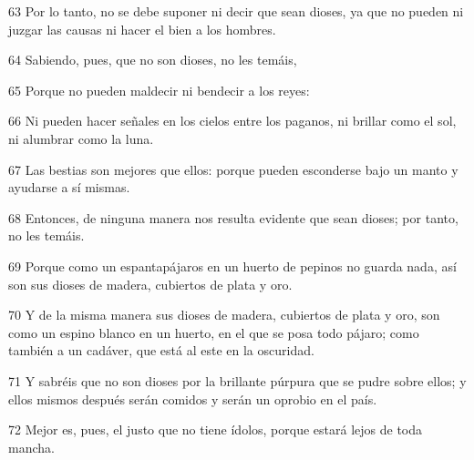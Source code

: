 \par 63 Por lo tanto, no se debe suponer ni decir que sean dioses, ya que no pueden ni juzgar las causas ni hacer el bien a los hombres.
\par 64 Sabiendo, pues, que no son dioses, no les temáis,
\par 65 Porque no pueden maldecir ni bendecir a los reyes:
\par 66 Ni pueden hacer señales en los cielos entre los paganos, ni brillar como el sol, ni alumbrar como la luna.
\par 67 Las bestias son mejores que ellos: porque pueden esconderse bajo un manto y ayudarse a sí mismas.
\par 68 Entonces, de ninguna manera nos resulta evidente que sean dioses; por tanto, no les temáis.
\par 69 Porque como un espantapájaros en un huerto de pepinos no guarda nada, así son sus dioses de madera, cubiertos de plata y oro.
\par 70 Y de la misma manera sus dioses de madera, cubiertos de plata y oro, son como un espino blanco en un huerto, en el que se posa todo pájaro; como también a un cadáver, que está al este en la oscuridad.
\par 71 Y sabréis que no son dioses por la brillante púrpura que se pudre sobre ellos; y ellos mismos después serán comidos y serán un oprobio en el país.
\par 72 Mejor es, pues, el justo que no tiene ídolos, porque estará lejos de toda mancha.



